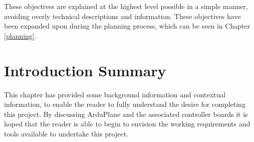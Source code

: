 These objectives are explained at the highest level possible in a simple manner, avoiding overly technical descriptions and information. These objectives have been expanded upon during the planning process, which can be seen in Chapter \ref{planning}.


\section{Introduction Summary}
\label{intro:summary}

This chapter has provided some background information and contextual information, to enable the reader to fully understand the desire for completing this project. By discussing ArduPlane and the associated controller boards it is hoped that the reader is able to begin to envision the working requirements and tools available to undertake this project. 